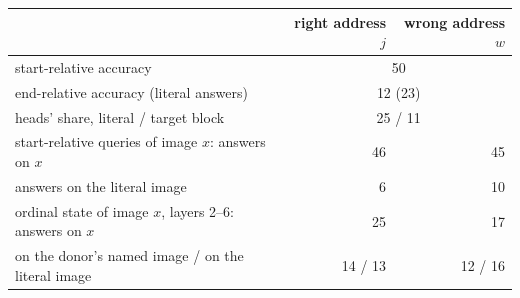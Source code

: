 \begin{tabular}{lrr}
\toprule
 & right address $j$ & wrong address $w$ \\
\midrule
start-relative accuracy & \multicolumn{2}{c}{50} \\
end-relative accuracy (literal answers) & \multicolumn{2}{c}{12 (23)} \\
heads' share, literal / target block & \multicolumn{2}{c}{25 / 11} \\
\midrule
start-relative queries of image $x$: answers on $x$ & 46 & 45 \\
\quad answers on the literal image & 6 & 10 \\
ordinal state of image $x$, layers 2--6: answers on $x$ & 25 & 17 \\
\quad on the donor's named image / on the literal image & 14 / 13 & 12 / 16 \\
\bottomrule
\end{tabular}
